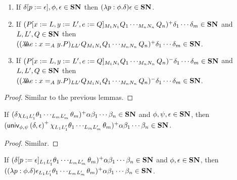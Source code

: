 
\begin{lemma}
\label{lm:SNothers}
$ $
\begin{enumerate}
\item
If $\delta[p:=\epsilon], \phi, \epsilon \in \mathbf{SN}$ then $(\lambda p:\phi.\delta)\epsilon \in \mathbf{SN}$.
\item
If $(P[x:=L, y:=L', e:=Q]_{M_1 N_1} Q_1 \cdots_{M_n N_n} Q_n)^+ \delta_1 \cdots \delta_m \in \mathbf{SN}$ and $L, L', Q \in \mathbf{SN}$ then $((\lambda \!\! \lambda \!\! \lambda e:x =_A y.P)_{L L'} Q_{M_1 N_1} Q_1 \cdots_{M_n N_n} Q_n)^+ \delta_1 \cdots \delta_m \in \mathbf{SN}$.
\item
If $(P[x:=L, y:=L', e:=Q]_{M_1 N_1} Q_1 \cdots_{M_n N_n} Q_n)^- \delta_1 \cdots \delta_m \in \mathbf{SN}$ and $L, L', Q \in \mathbf{SN}$ then $((\lambda \!\! \lambda \!\! \lambda e:x =_A y.P)_{L L'} Q_{M_1 N_1} Q_1 \cdots_{M_n N_n} Q_n)^- \delta_1 \cdots \delta_m \in \mathbf{SN}$.
\end{enumerate}
\end{lemma}

\begin{proof}
Similar to the previous lemmas.
\end{proof}

\begin{lemma}
\label{lm:wte_loi1}
If $(\delta \chi_{L_1 L_1'} \theta_1 \cdots_{L_m L_m'} \theta_m)^+ \alpha \beta_1 \cdots \beta_n \in \mathbf{SN}$ and $\phi, \psi, \epsilon \in \mathbf{SN}$, then
$(\mathsf{univ}_{{\phi} , {\psi}} \left( {\delta} , {\epsilon} \right)^+ \chi_{L_1 L_1'} \theta_1 \cdots_{L_m L_m'} \theta_m)^+ \alpha \beta_1 \cdots \beta_n \in \mathbf{SN}$.
\end{lemma}

\begin{proof}
Similar.
\end{proof}

\begin{lemma}
\label{lm:wte_loi2}
If $(\delta[p:=\epsilon]_{L_1 L_1'} \theta_1 \cdots_{L_m L_m'} \theta_m)^+ \alpha \beta_1 \cdots \beta_n \in \mathbf{SN}$ and $\phi, \epsilon \in \mathbf{SN}$, then
$((\lambda p:\phi.\delta) \epsilon_{L_1 L_1'} \theta_1 \cdots_{L_m L_m'} \theta_m)^+ \alpha \beta_1 \cdots \beta_n \in \mathbf{SN}$.
\end{lemma}

